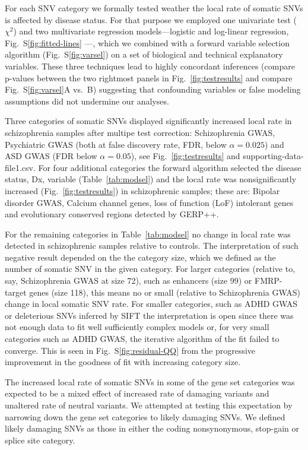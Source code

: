 \documentclass[letterpaper]{article}
\begin{document}
For each SNV category we formally tested weather the local rate of somatic SNVs is
affected by disease status.  For that purpose we employed one univariate test
($\chi^2$) and two multivariate regression models---logistic and log-linear
regression, Fig.~S\ref{fig:fitted-lines} ---, which we combined with a forward
variable selection algorithm (Fig.~S\ref{fig:varsel}) on a set of biological
and technical explanatory variables.  These three techniques
lead to highly concordant inferences (compare p-values between the two
rightmost panels in Fig.~\ref{fig:testresults} and compare
Fig.~S\ref{fig:varsel}A vs.~B) suggesting that confounding variables or false
modeling assumptions did not undermine our analyses.

Three categories of somatic SNVs displayed significantly increased local rate
in schizophrenia samples after multipe test correction: Schizophrenia GWAS,
Psychiatric GWAS (both at false discovery rate, FDR, below $\alpha=0.025$) and
ASD GWAS (FDR below $\alpha=0.05$), see Fig.~\ref{fig:testresults} and
supporting-data-file1.csv.  For four additional categories the forward algorithm selected the
disease status, Dx, variable (Table~\ref{tab:modsel}) and the local rate was
nonsignificantly increased (Fig.~\ref{fig:testresults}) in schizophrenic
samples; these are: Bipolar disorder GWAS, Calcium channel genes, loss of
function (LoF) intolerant genes and evolutionary conserved regions detected by
GERP++.

For the remaining categories in Table~\ref{tab:modsel} no change in local rate
was detected in schizophrenic samples relative to controls.  The
interpretation of such negative result depended on the the category size,
which we defined as the number of somatic SNV in the given category.  For
larger categories (relative to, say, Schizophrenia GWAS at size 72), such as
enhancers (size 99) or FMRP-target genes (size 118), this means no or small
(relative to Schizophrenia GWAS) change in local somatic SNV rate.  For
smaller categories, such as ADHD GWAS or deleterious SNVs inferred by SIFT the
interpretation is open since there was not enough data to fit well
sufficiently complex models or, for very small categories such as ADHD GWAS,
the iterative algorithm of the fit failed to converge.  This is seen in
Fig.~S\ref{fig:residual-QQ} from the progressive improvement in the
goodness of fit with increasing category size.

The increased local rate of somatic SNVs in some of the
gene set categories was expected to be a mixed effect of increased rate of
damaging variants and unaltered rate of neutral variants. We attempted at
testing this expectation by narrowing down the gene set categories to likely
damaging SNVs.  We defined likely damaging SNVs as those in either the coding nonsynonymous,
stop-gain or splice site category.
\end{document}
